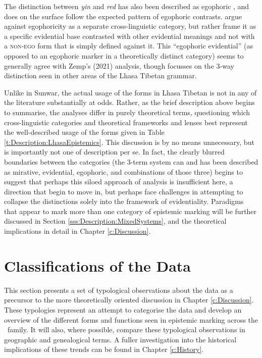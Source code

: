 The distinction between \textit{yin} and \textit{red} has also been described as egophoric \cite{EgoIntro}, and does on the surface follow the expected pattern of egophoric contrasts.  argue against egophoricity as a separate cross-linguistic category, but rather frame it as a specific evidential base contrasted with other evidential meanings and not with a \textsc{non-ego} form that is simply defined against it. This ``egophoric evidential'' (as opposed to an egophoric marker in a theoretically distinct category) seems to generally agree with Zemp's (2021) analysis, though focusses on the 3-way distinction seen in other areas of the Lhasa Tibetan grammar. 

Unlike in Sunwar, the actual usage of the forms in Lhasa Tibetan is not in any of the literature substantially at odds. Rather, as the brief description above begins to summarise, the analyses differ in purely theoretical terms, questioning which cross-linguistic categories and theoretical frameworks and lenses best represent the well-described usage of the forms given in Table \ref{t:Description:LhasaEpistemics}. This discussion is by no means unnecessary, but is importantly not one of description per se. In fact, the clearly blurred boundaries between the categories (the 3-term system can and has been described as mirative, evidential, egophoric, and combinations of those three) begins to suggest that perhaps this siloed approach of analysis is insufficient here, a direction that  begin to move in, but perhaps face challenges in attempting to collapse the distinctions solely into the framework of evidentiality. Paradigms that appear to mark more than one category of epistemic marking will be further discussed in Section \ref{sss:Description:MixedSystems}, and the theoretical implications in detail in Chapter \ref{c:Discussion}.



\section{Classifications of the Data}
This section presents a set of typological observations about the data as a precursor to the more theoretically oriented discussion in Chapter \ref{c:Discussion}. These typologies represent an attempt to categorise the data and develop an overview of the different forms and functions seen in epistemic marking across the \lfam\ family. It will also, where possible, compare these typological observations in geographic and genealogical terms. A fuller investigation into the historical implications of these trends can be found in Chapter \ref{c:History}.
